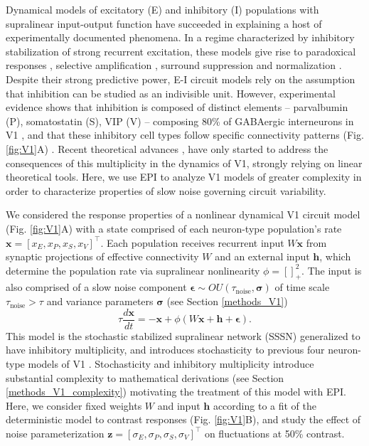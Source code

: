 \documentclass[11pt]{article}
\begin{document}
Dynamical models of excitatory (E) and inhibitory (I) populations with supralinear input-output function have succeeded in explaining a host of experimentally documented phenomena.
In a regime characterized by inhibitory stabilization of strong recurrent excitation, these models give rise to paradoxical responses \cite{tsodyks1997paradoxical}, selective amplification  \cite{goldman2009memory, murphy2009balanced}, surround suppression \cite{ozeki2009inhibitory} and normalization \cite{rubin2015stabilized}. 
Despite their strong predictive power, E-I circuit models rely on the assumption that inhibition can be studied as an indivisible unit. 
However, experimental evidence shows that inhibition is composed of distinct elements -- parvalbumin (P), somatostatin (S), VIP (V) --
composing 80\% of GABAergic interneurons in V1 \cite{markram2004interneurons, rudy2011three, tremblay2016}, and that these inhibitory cell types follow specific connectivity patterns (Fig. \ref{fig:V1}A) \cite{pfeffer2013inhibition}.
Recent theoretical advances \cite{litwin2016inhibitory, GarciaDelMolino2017, Chen2019},  have only started to address the consequences of this multiplicity in the dynamics of V1, strongly relying on linear theoretical tools. 
Here, we use EPI to analyze V1 models of greater complexity in order to characterize properties of slow noise governing circuit variability.

We considered the response properties of a nonlinear dynamical V1 circuit model (Fig. \ref{fig:V1}A) with a state comprised of each neuron-type population's rate $\mathbf{x} = \left[x_E, x_P , x_S, x_V \right]^\top$.
Each population receives recurrent input $W \mathbf{x}$ from synaptic projections of effective connectivity $W$ and an external input $\mathbf{h}$, which determine the population rate via supralinear nonlinearity $\phi = \left[\right]^2_+$.
The input is also comprised of a slow noise component $\bm{\epsilon} \sim OU\left(\tau_{\text{noise}}, \bm{\sigma} \right)$ of time scale $\tau_{\text{noise}} > \tau$ and variance parameters $\bm{\sigma}$ (see Section \ref{methods_V1})
\begin{equation}
    \tau \frac{d\mathbf{x}}{dt} = -\mathbf{x} +\phi(W\mathbf{x} + \mathbf{h} + \bm{\epsilon}).
\end{equation}
This model is the stochastic stabilized supralinear network (SSSN) \cite{hennequin2018dynamical} generalized to have inhibitory multiplicity, and introduces stochasticity to previous four neuron-type models of V1 \cite{litwin2016inhibitory}.
Stochasticity and inhibitory multiplicity introduce substantial complexity to mathematical derivations (see Section \ref{methods_V1_complexity}) motivating the treatment of this model with EPI.
Here, we consider fixed weights $W$ and input $\mathbf{h}$ according to a fit of the deterministic model to contrast responses \cite{palmigiano2020structure} (Fig. \ref{fig:V1}B), and study the effect of noise parameterization $\mathbf{z} = [\sigma_E, \sigma_P, \sigma_S, \sigma_V]^\top$ on fluctuations at 50\% contrast. 
\end{document}
